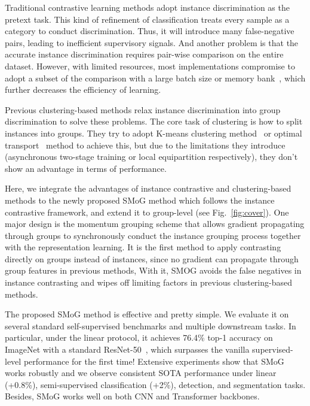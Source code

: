 \documentclass[runningheads]{style/llncs}
\begin{document}
Traditional contrastive learning methods adopt instance discrimination as the pretext task. This kind of refinement of classification treats every sample as a category to conduct discrimination. Thus, it will introduce many false-negative pairs, leading to inefficient supervisory signals. And another problem is that the accurate instance discrimination requires pair-wise comparison on the entire dataset. However, with limited resources, most implementations compromise to adopt a subset of the comparison with a large batch size or memory bank~\cite{moco,wu2018unsupervised}, which further decreases the efficiency of learning.

Previous clustering-based methods relax instance discrimination into group discrimination to solve these problems. The core task of clustering is how to split instances into groups. They try to adopt K-means clustering method~\cite{deepcluster,ODC} or optimal transport~\cite{sela,swav} method to achieve this, but due to the limitations they introduce (asynchronous two-stage training or local equipartition respectively), they don't show an advantage in terms of performance.

Here, we integrate the advantages of instance contrastive and clustering-based methods to the newly proposed SMoG method which follows the instance contrastive framework, and extend it to group-level (see Fig.~\ref{fig:cover}). One major design is the momentum grouping scheme that allows gradient propagating through groups to synchronously conduct the instance grouping process together with the representation learning. It is the first method to apply contrasting directly on groups instead of instances, since no gradient can propagate through group features in previous methods, With it, SMOG avoids the false negatives in instance contrasting and wipes off limiting factors in previous clustering-based methods.

The proposed SMoG method is effective and pretty simple.  We evaluate it on several standard self-supervised benchmarks and multiple downstream tasks. In particular, under the linear protocol, it achieves 76.4\% top-1 accuracy on ImageNet with a standard ResNet-50~\cite{resnet}, which surpasses the vanilla supervised-level performance for the first time! Extensive experiments show that SMoG works robustly and we observe consistent SOTA performance under linear (+0.8\%), semi-supervised classification (+2\%), detection, and segmentation tasks. Besides, SMoG works well on both CNN and Transformer backbones.
\end{document}
